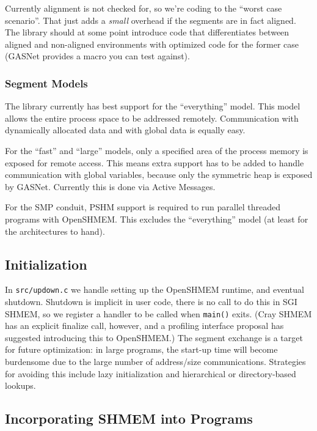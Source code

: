 \documentclass[english]{article}
\begin{document}
Currently alignment is not checked for, so we're coding to the
``worst case scenario''. That just adds a \emph{small} overhead if
the segments are in fact aligned. The library should at some point
introduce code that differentiates between aligned and non-aligned
environments with optimized code for the former case (GASNet provides
a macro you can test against).

\subsubsection{Segment Models}

The library currently has best support for the ``everything''
model. This model allows the entire process space to be addressed
remotely. Communication with dynamically allocated data and with
global data is equally easy.

For the ``fast'' and ``large'' models, only a specified area of
the process memory is exposed for remote access. This means extra
support has to be added to handle communication with global variables,
because only the symmetric heap is exposed by GASNet. Currently this
is done via Active Messages.

For the SMP conduit, PSHM support is required to run parallel threaded
programs with OpenSHMEM. This excludes the ``everything'' model (at
least for the architectures to hand).

\subsection{Initialization}

In \texttt{src/updown.c} we handle setting up the OpenSHMEM runtime,
and eventual shutdown. Shutdown is implicit in user code, there is no
call to do this in SGI SHMEM, so we register a handler to be called
when \texttt{main()} exits. (Cray SHMEM has an explicit finalize call,
however, and a profiling interface proposal has suggested introducing
this to OpenSHMEM.) The segment exchange is a target for future
optimization: in large programs, the start-up time will become
burdensome due to the large number of address/size
communications. Strategies for avoiding this include lazy
initialization and hierarchical or directory-based lookups.

\subsection{Incorporating SHMEM into Programs}
\end{document}
